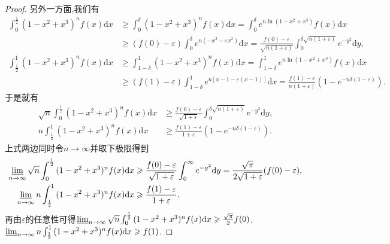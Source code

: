\documentclass[../../main.tex]{subfiles}
\begin{document}
\begin{proof}
另外一方面,我们有
\begin{align*}
\int_0^{\frac{1}{2}}{(1 - x^2 + x^3)^nf(x)\mathrm{d}x}&\geqslant \int_0^{\delta}{(1 - x^2 + x^3)^nf(x)\mathrm{d}x}=\int_0^{\delta}{e^{n\ln(1 - x^2 + x^3)}f(x)\mathrm{d}x}\\
&\geqslant (f(0) - \varepsilon)\int_0^{\delta}{e^{n(-x^2 - \varepsilon x^2)}\mathrm{d}x}=\frac{f(0) - \varepsilon}{\sqrt{n(1 + \varepsilon)}}\int_0^{\delta\sqrt{n(1 + \varepsilon)}}{e^{-y^2}\mathrm{d}y},
\end{align*}
\begin{align*}
\int_{\frac{1}{2}}^1{(1 - x^2 + x^3)^nf(x)\mathrm{d}x}&\geqslant \int_{1 - \delta}^1{(1 - x^2 + x^3)^nf(x)\mathrm{d}x}=\int_{1 - \delta}^1{e^{n\ln(1 - x^2 + x^3)}f(x)\mathrm{d}x}\\
&\geqslant (f(1) - \varepsilon)\int_{1 - \delta}^1{e^{n[x - 1 - \varepsilon(x - 1)]}\mathrm{d}x}=\frac{f(1) - \varepsilon}{n(1 + \varepsilon)}\left(1 - e^{-n\delta(1 - \varepsilon)}\right).
\end{align*}
于是就有
\begin{align*}
\sqrt{n}\int_0^{\frac{1}{2}}{(1 - x^2 + x^3)^nf(x)\mathrm{d}x}&\geqslant \frac{f(0) - \varepsilon}{\sqrt{1 + \varepsilon}}\int_0^{\delta\sqrt{n(1 + \varepsilon)}}{e^{-y^2}\mathrm{d}y},\\
n\int_{\frac{1}{2}}^1{(1 - x^2 + x^3)^nf(x)\mathrm{d}x}&\geqslant \frac{f(1) - \varepsilon}{1 + \varepsilon}\left(1 - e^{-n\delta(1 - \varepsilon)}\right).
\end{align*}
上式两边同时令\(n\rightarrow\infty\)并取下极限得到
\begin{align*}
\varliminf_{n\rightarrow\infty}\sqrt{n}\int_0^{\frac{1}{2}}{(1 - x^2 + x^3)^nf(x)\mathrm{d}x}&\geqslant \frac{f(0) - \varepsilon}{\sqrt{1 + \varepsilon}}\int_0^{\infty}{e^{-y^2}\mathrm{d}y}=\frac{\sqrt{\pi}}{2\sqrt{1 + \varepsilon}}(f(0) - \varepsilon),\\
\varliminf_{n\rightarrow\infty}n\int_{\frac{1}{2}}^1{(1 - x^2 + x^3)^nf(x)\mathrm{d}x}&\geqslant \frac{f(1) - \varepsilon}{1 + \varepsilon}.
\end{align*}
再由\(\varepsilon\)的任意性可得\(\varliminf_{n\rightarrow\infty}\sqrt{n}\int_0^{\frac{1}{2}}{(1 - x^2 + x^3)^nf(x)\mathrm{d}x}\geqslant \frac{\sqrt{\pi}}{2}f(0)\),\(\varliminf_{n\rightarrow\infty}n\int_{\frac{1}{2}}^1{(1 - x^2 + x^3)^nf(x)\mathrm{d}x}\geqslant f(1)\).


\end{proof}
\end{document}
